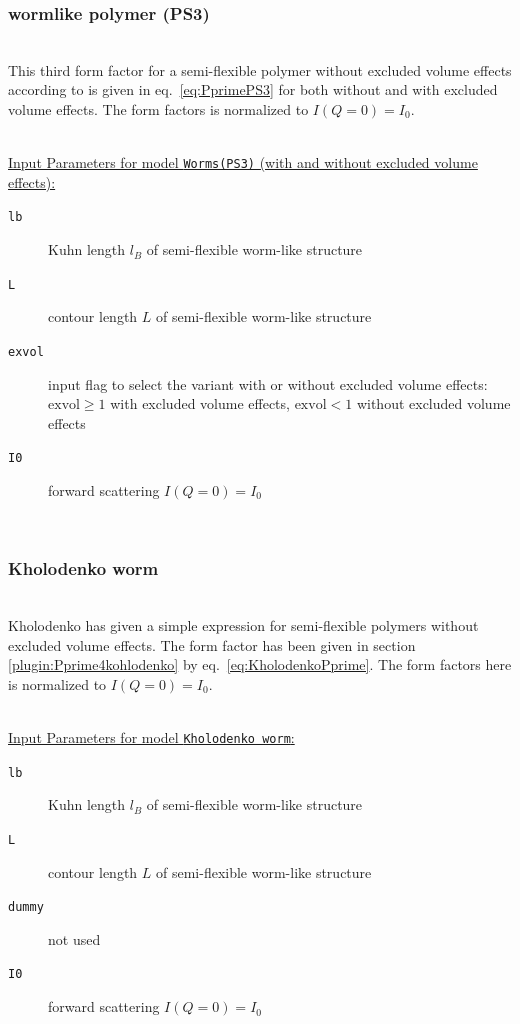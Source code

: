 \subsubsection{wormlike polymer (PS3)}
\label{sect:ffWorm(PS3)}
~\\
This third form factor for a semi-flexible polymer without excluded volume effects according to \cite{Pedersen96Macrom} is given in eq.\ \ref{eq:PprimePS3} for both without and with excluded volume effects. The form factors is normalized to $I(Q=0)=I_0$.

\vspace{5mm}

\hspace{1pt}\\
\underline{Input Parameters for model \texttt{Worms(PS3)} (with and without excluded volume effects):}\\
\begin{description}
\item[\texttt{lb}] Kuhn length $l_B$ of semi-flexible worm-like structure
\item[\texttt{L}] contour length $L$ of semi-flexible worm-like structure
\item[\texttt{exvol}] input flag to select the variant with or without excluded volume effects: $\mathrm{exvol} \geq 1$ with excluded volume effects, $\mathrm{exvol} < 1$ without excluded volume effects
\item[\texttt{I0}] forward scattering $I(Q=0)=I_0$
\end{description}

\vphantom{.}~\\

\subsubsection{Kholodenko worm}
\label{sect:ffKholodenkoWorm}
~\\
Kholodenko \cite{kholodenko93} has given a simple expression for semi-flexible polymers without excluded volume effects. The form factor has been given in section \ref{plugin:Pprime4kohlodenko} by eq.\ \ref{eq:KholodenkoPprime}. The form factors here is normalized to $I(Q=0)=I_0$.

\vspace{5mm}

\hspace{1pt}\\
\underline{Input Parameters for model \texttt{Kholodenko worm}:}\\
\begin{description}
\item[\texttt{lb}] Kuhn length $l_B$ of semi-flexible worm-like structure
\item[\texttt{L}] contour length $L$ of semi-flexible worm-like structure
\item[\texttt{dummy}] not used
\item[\texttt{I0}] forward scattering $I(Q=0)=I_0$
\end{description}

